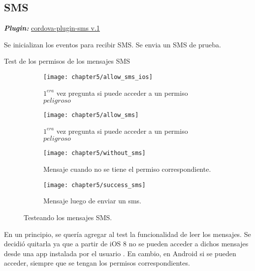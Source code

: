 \subsection*{SMS}
\textbf{\emph{Plugin:}} \href{https://github.com/floatinghotpot/cordova-plugin-sms}{cordova-plugin-sms v.1}\\
\begin{algorithm}
	\begin{algorithmic}[1]
		\STATE Se inicializan los eventos para recibir SMS. 
		\STATE Se envia un SMS de prueba.
	\end{algorithmic}
	\caption{Test de los permisos de los mensajes SMS}\label{alg:chap5_test_sms}
\end{algorithm}
\begin{figure}[!ht]
	\begin{subfigure}{.32\textwidth}
	    \centering
		\texttt{[image: chapter5/allow\_sms\_ios]}
		\caption{$1^{era}$ vez pregunta si puede acceder a un permiso $peligroso$}
		\label{fig:chapter05:allow_sms_ios}
	\end{subfigure}
	\begin{subfigure}{.32\textwidth}
	    \centering
		\texttt{[image: chapter5/allow\_sms]}
		\caption{$1^{era}$ vez pregunta si puede acceder a un permiso $peligroso$}
		\label{fig:chapter05:allow_sms}
	\end{subfigure}		
	\begin{subfigure}{.32\textwidth}
	    \centering
		\texttt{[image: chapter5/without\_sms]}
		\caption{Mensaje cuando no se tiene el permiso correspondiente.}
		\label{fig:chapter05:without_sms}
	\end{subfigure}
	\begin{subfigure}{.32\textwidth}
	    \centering
		\texttt{[image: chapter5/success\_sms]}
		\caption{Mensaje luego de enviar un sms.}
		\label{fig:chapter05:success_sms}
	\end{subfigure}
	\caption{Testeando los mensajes SMS.}
	\label{fig:chapter05:sms_test}
\end{figure}
En un principio, se quer\'ia agregar al test la funcionalidad de leer los mensajes. Se decidi\'o quitarla ya que a partir de iOS 8 no se pueden acceder a dichos mensajes desde una app instalada por el usuario \cite{foda}. En cambio, en Android si se pueden acceder, siempre que se tengan los permisos correspondientes.
